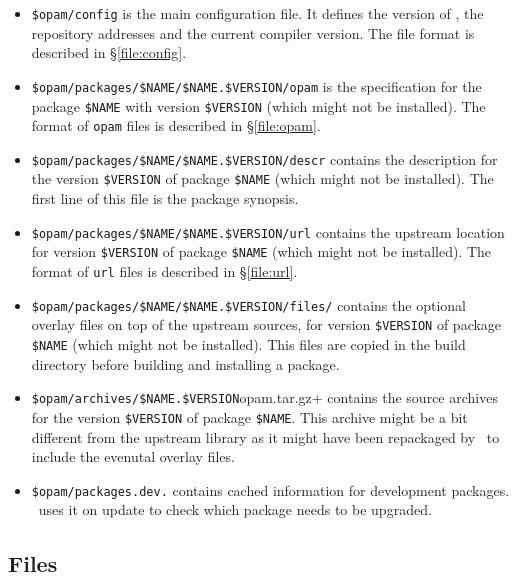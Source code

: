 \documentclass[a4paper,10pt]{article}
\begin{document}
\begin{itemize}

\item {\tt \$opam/config} is the main configuration file. It defines
  the version of \OPAM, the repository addresses and the current compiler
  version. The file format is described in \S\ref{file:config}.

\item \verb+$opam/packages/$NAME/$NAME.$VERSION/opam+ is the
  specification for the package \verb+$NAME+ with version
  \verb+$VERSION+ (which might not be installed). The format of {\tt opam}
  files is described in \S\ref{file:opam}.

\item \verb+$opam/packages/$NAME/$NAME.$VERSION/descr+ contains the
  description for the version \verb+$VERSION+ of package \verb+$NAME+
  (which might not be installed). The first line of this file is the
  package synopsis.

\item \verb+$opam/packages/$NAME/$NAME.$VERSION/url+ contains the
  upstream location for version \verb+$VERSION+ of package \verb+$NAME+
  (which might not be installed). The format of {\tt url} files is
  described in \S\ref{file:url}.

\item \verb+$opam/packages/$NAME/$NAME.$VERSION/files/+ contains the
  optional overlay files on top of the upstream sources, for version
  \verb+$VERSION+ of package \verb+$NAME+ (which might not be
  installed). This files are copied in the build directory before
  building and installing a package.

\item \verb+$opam/archives/$NAME.$VERSION+opam.tar.gz+ contains the source
  archives for the version \verb+$VERSION+ of package
  \verb+$NAME+. This archive might be a bit different from the
  upstream library as it might have been repackaged by \OPAM\ to include
  the evenutal overlay files.

\item \verb+$opam/packages.dev.+ contains cached information for
  development packages. \OPAM\ uses it on update to check which
  package needs to be upgraded.

\end{itemize}

\subsection{Files}
\end{document}
